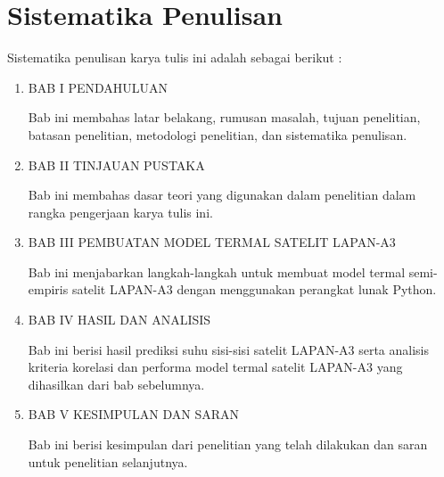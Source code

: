 \section{Sistematika Penulisan}

Sistematika penulisan karya tulis ini adalah sebagai berikut :

\begin{enumerate}
\item BAB I PENDAHULUAN

Bab ini membahas latar belakang, rumusan masalah, tujuan penelitian, batasan
penelitian, metodologi penelitian, dan sistematika penulisan.

\item BAB II TINJAUAN PUSTAKA

Bab ini membahas dasar teori yang digunakan dalam penelitian dalam rangka
pengerjaan karya tulis ini.

\item BAB III PEMBUATAN MODEL TERMAL SATELIT LAPAN-A3

Bab ini menjabarkan langkah-langkah untuk membuat model termal semi-empiris
satelit LAPAN-A3 dengan menggunakan perangkat lunak Python.

\item BAB IV HASIL DAN ANALISIS

Bab ini berisi hasil prediksi suhu sisi-sisi satelit LAPAN-A3 serta analisis
kriteria korelasi dan performa model termal satelit LAPAN-A3 yang dihasilkan
dari bab sebelumnya.

\item BAB V KESIMPULAN DAN SARAN

Bab ini berisi kesimpulan dari penelitian yang telah dilakukan dan saran
untuk penelitian selanjutnya.
\end{enumerate}
